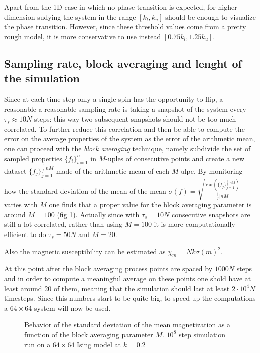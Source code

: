 \documentclass[a4paper, 11pt]{article}
\begin{document}
      Apart from the 1D case in which no phase transition is expected, for higher dimension sudying the system in the range $[k_l,k_u]$ should be enough to visualize the phase transition. However, since these threshold values come from a pretty rough model, it is more conservative to use instead $[0.75k_l,1.25k_u]$.


    \subsection{Sampling rate, block averaging and lenght of the simulation}
      Since at each time step only a single spin has the opportunity to flip, a reasonable a reasonable sampling rate is taking a snapshot of the system every $\tau_s \approx 10N$ steps: this way two subsequent snapshots should not be too much correlated. To further reduce this correlation and then be able to compute the error on the average properties of the system as the error of the arithmetic mean, one can proceed with the \emph{block averaging} technique, namely subdivide the set of sampled properties $\{f_i\}_{i=1}^n$ in $M$-uples of consecutive points and create a new dataset $\{f_j\}_{j=1}^{\frac[f]{n}{M}}$ made of the arithmetic mean of each $M$-ulpe.
      By monitoring how the standard deviation of the mean of the mean $\sigma(f) = \sqrt{\frac{\text{Var}\left( \{f_j\}_{j=1}^{\frac[f]{n}{M}} \right)}{\frac[f]{n}{M}}}$ varies with $M$ one finds that a proper value for the block averaging parameter is around $M = 100$ (fig \ref{fig:block_averaging}).
      Actually since with $\tau_s = 10N$ consecutive snapshots are still a lot correlated, rather than using $M = 100$ it is more computationally efficient to do $\tau_s = 50N$ and $M = 20$.

      Also the magnetic susceptibility can be estimated as $\chi_m = Nk\sigma(m)^2$.

      At this point after the block averaging process points are spaced by $1000 N$ steps and in order to compute a meaningful average on these points one shold have at least around 20 of them, meaning that the simulation should last at least $2\cdot10^4 N$ timesteps.
      Since this numbers start to be quite big, to speed up the computations a $64\times64$ system will now be used.

      \begin{figure}[H]
        \centering
        \caption{Behavior of the standard deviation of the mean magnetization as a function of the block averaging parameter $M$. $10^8$ step simulation run on a $64\times64$ Ising model at $k = 0.2$}
        \label{fig:block_averaging}
      \end{figure}
\end{document}
